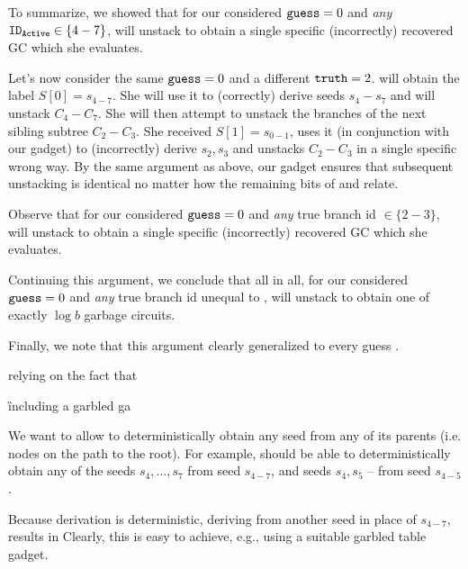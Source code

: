 To summarize, we showed that for our considered $\mathtt{guess}=0$ and {\em any}  $\mathtt{ID_{Active}} \in \{4-7\}$, \E will unstack to obtain a single specific (incorrectly) recovered GC which she evaluates.

Let's now consider the same $\mathtt{guess}=0$ and a different $\mathtt{truth} = 2$.  \E will obtain the label $S[0]=s_{4-7}$.  She will use it to (correctly) derive seeds $s_4-s_7$ and will unstack $C_4-C_7$.  She will then attempt to unstack the branches of the next sibling subtree $C_2-C_3$.  She received  $S[1] = s_{0-1}$, uses it (in conjunction with our gadget) to (incorrectly) derive $s_2,s_3$ and unstacks $C_2-C_3$ in a single specific wrong way. By the same argument as above, our gadget ensures that subsequent unstacking is identical  no matter how the remaining bits of \truth and \guess relate.

Observe that for our considered $\mathtt{guess}=0$ and {\em any} true branch id $\in \{2-3\}$, \E will unstack to obtain a single specific (incorrectly) recovered GC which she evaluates.

Continuing this argument, we conclude that all in all, for our considered $\mathtt{guess}=0$ and {\em any} true branch id unequal to \guess, \E will unstack to obtain one of exactly $\log b$ garbage circuits.


Finally, we note  that this argument clearly generalized to every guess \guess.




\bigskip
 relying on the fact that

  \G including a garbled ga











We want to allow \E to deterministically obtain any seed from any of its parents (i.e. nodes on the path to the root).  For example, \E should be able to deterministically obtain any of the seeds $s_4,...,s_7$ from seed $s_{4-7}$, and seeds $s_4, s_5$ -- from seed $s_{4-5}$. 


 Because derivation is deterministic, deriving from another seed in place of $s_{4-7}$, results in 
Clearly, this is easy to achieve, e.g., using a suitable garbled table gadget.








